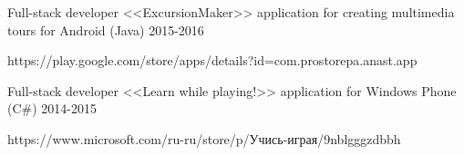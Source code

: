 \begin{cventries}

\cventry
{Full-stack developer} %
{<<ExcursionMaker>> application for creating multimedia tours for Android  (Java) } %
{} %
{2015-2016} %
{ %
 \begin{cvitems}
\item {https://play.google.com/store/apps/details?id=com.prostorepa.anast.app}
 \end{cvitems}
}


\cventry
{Full-stack developer} %
{<<Learn while playing!>> application for Windows Phone  (C\#) } %
{} %
{2014-2015} %
{ %
 \begin{cvitems}
\item {https://www.microsoft.com/ru-ru/store/p/Учись-играя/9nblgggzdbbh}
 \end{cvitems}
}

\end{cventries}